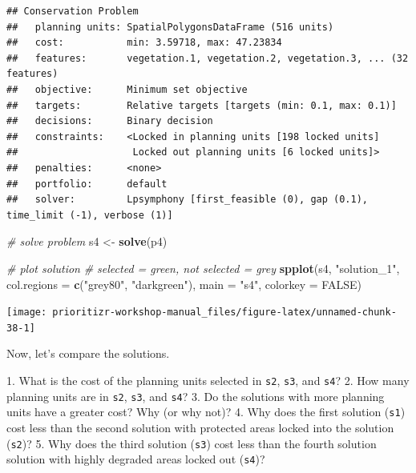\documentclass[12pt,]{book}
\makeatletter
\newenvironment{Shaded}{\begin{snugshade}}{\end{snugshade}}
\newcommand{\KeywordTok}[1]{\textcolor[rgb]{0.13,0.29,0.53}{\textbf{#1}}}
\newcommand{\DataTypeTok}[1]{\textcolor[rgb]{0.13,0.29,0.53}{#1}}
\newcommand{\StringTok}[1]{\textcolor[rgb]{0.31,0.60,0.02}{#1}}
\newcommand{\CommentTok}[1]{\textcolor[rgb]{0.56,0.35,0.01}{\textit{#1}}}
\newcommand{\OtherTok}[1]{\textcolor[rgb]{0.56,0.35,0.01}{#1}}
\newcommand{\NormalTok}[1]{#1}
\newenvironment{kframe}{%
\medskip{}
\setlength{\fboxsep}{.8em}
 \def\at@end@of@kframe{}%
 \ifinner\ifhmode%
  \def\at@end@of@kframe{\end{minipage}}%
  \begin{minipage}{\columnwidth}%
 \fi\fi%
 \def\FrameCommand##1{\hskip\@totalleftmargin \hskip-\fboxsep
 \colorbox{shadecolor}{##1}\hskip-\fboxsep
     \hskip-\linewidth \hskip-\@totalleftmargin \hskip\columnwidth}%
 \MakeFramed {\advance\hsize-\width
   \@totalleftmargin\z@ \linewidth\hsize
   \@setminipage}}%
 {\par\unskip\endMakeFramed%
 \at@end@of@kframe}
\newenvironment{rmdblock}[1]
  {
  \begin{itemize}
  \renewcommand{\labelitemi}{
    \raisebox{-.7\height}[0pt][0pt]{
      {\setkeys{Gin}{width=3em,keepaspectratio}\texttt{[image: images/\#1]}}
    }
  }
  \setlength{\fboxsep}{1em}
  \begin{kframe}
  \item
  }
  {
  \end{kframe}
  \end{itemize}
  }
\newenvironment{rmdquestion}
  {\begin{rmdblock}{question}}
  {\end{rmdblock}}
\makeatother
\begin{document}
\begin{verbatim}
## Conservation Problem
##   planning units: SpatialPolygonsDataFrame (516 units)
##   cost:           min: 3.59718, max: 47.23834
##   features:       vegetation.1, vegetation.2, vegetation.3, ... (32 features)
##   objective:      Minimum set objective 
##   targets:        Relative targets [targets (min: 0.1, max: 0.1)]
##   decisions:      Binary decision 
##   constraints:    <Locked in planning units [198 locked units]
##                    Locked out planning units [6 locked units]>
##   penalties:      <none>
##   portfolio:      default
##   solver:         Lpsymphony [first_feasible (0), gap (0.1), time_limit (-1), verbose (1)]
\end{verbatim}

\begin{Shaded}
\begin{Highlighting}[]
\CommentTok{# solve problem}
\NormalTok{s4 <-}\StringTok{ }\KeywordTok{solve}\NormalTok{(p4)}

\CommentTok{# plot solution}
\CommentTok{# selected = green, not selected = grey}
\KeywordTok{spplot}\NormalTok{(s4, }\StringTok{"solution_1"}\NormalTok{, }\DataTypeTok{col.regions =} \KeywordTok{c}\NormalTok{(}\StringTok{"grey80"}\NormalTok{, }\StringTok{"darkgreen"}\NormalTok{), }\DataTypeTok{main =} \StringTok{"s4"}\NormalTok{,}
       \DataTypeTok{colorkey =} \OtherTok{FALSE}\NormalTok{)}
\end{Highlighting}
\end{Shaded}

\begin{center}\texttt{[image: prioritizr-workshop-manual\_files/figure-latex/unnamed-chunk-38-1]} \end{center}

\clearpage

Now, let's compare the solutions.

\begin{rmdquestion} 1. What is the cost of the planning units
selected in \texttt{s2}, \texttt{s3}, and \texttt{s4}? 2. How many
planning units are in \texttt{s2}, \texttt{s3}, and \texttt{s4}? 3. Do
the solutions with more planning units have a greater cost? Why (or why
not)? 4. Why does the first solution (\texttt{s1}) cost less than the
second solution with protected areas locked into the solution
(\texttt{s2})? 5. Why does the third solution (\texttt{s3}) cost less
than the fourth solution solution with highly degraded areas locked out
(\texttt{s4})? \end{rmdquestion}
\end{document}
